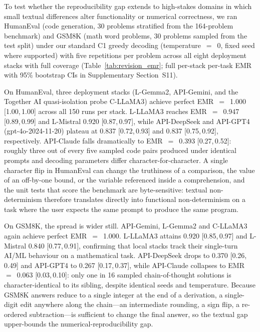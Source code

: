 \documentclass[sn-nature]{sn-jnl}
\begin{document}
To test whether the reproducibility gap extends to high-stakes domains in which small textual differences alter functionality or numerical correctness, we ran HumanEval (code generation, 30 problems stratified from the 164-problem benchmark\cite{chen2021humaneval}) and GSM8K (math word problems, 30 problems sampled from the test split\cite{cobbe2021gsm8k}) under our standard C1 greedy decoding (temperature~$=$~0, fixed seed where supported) with five repetitions per problem across all eight deployment stacks with full coverage (Table~\ref{tab:revision_emr}; full per-stack per-task EMR with 95\% bootstrap CIs in Supplementary Section~S11).

On HumanEval, three deployment stacks (L-Gemma2, API-Gemini, and the Together AI quasi-isolation probe C-LLaMA3) achieve perfect EMR~$=$~1.000 [1.00,\,1.00] across all 150 runs per stack.
L-LLaMA3 reaches EMR~$=$~0.947 [0.89,\,0.99] and L-Mistral 0.920 [0.87,\,0.97], while API-DeepSeek and API-GPT4 (gpt-4o-2024-11-20) plateau at 0.837 [0.72,\,0.93] and 0.837 [0.75,\,0.92], respectively.
API-Claude falls dramatically to EMR~$=$~0.393 [0.27,\,0.52]: roughly three out of every five sampled code pairs produced under identical prompts and decoding parameters differ character-for-character.
A single character flip in HumanEval can change the truthiness of a comparison, the value of an off-by-one bound, or the variable referenced inside a comprehension, and the unit tests that score the benchmark are byte-sensitive: textual non-determinism therefore translates directly into functional non-determinism on a task where the user expects the same prompt to produce the same program.

On GSM8K, the spread is wider still.
API-Gemini, L-Gemma2 and C-LLaMA3 again achieve perfect EMR~$=$~1.000.
L-LLaMA3 attains 0.920 [0.85,\,0.97] and L-Mistral 0.840 [0.77,\,0.91], confirming that local stacks track their single-turn AI/ML behaviour on a mathematical task.
API-DeepSeek drops to 0.370 [0.26,\,0.49] and API-GPT4 to 0.267 [0.17,\,0.37], while API-Claude collapses to EMR~$=$~0.063 [0.03,\,0.10]: only one in 16 sampled chain-of-thought solutions is character-identical to its sibling, despite identical seeds and temperature.
Because GSM8K answers reduce to a single integer at the end of a derivation, a single-digit edit anywhere along the chain---an intermediate rounding, a sign flip, a re-ordered subtraction---is sufficient to change the final answer, so the textual gap upper-bounds the numerical-reproducibility gap.
\end{document}
